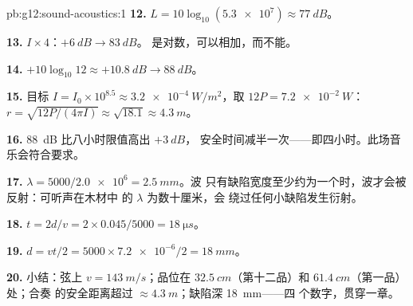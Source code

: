 \begin{solution}{pb:g12:sound-acoustics:1}
\textbf{12.} $L = 10\log_{10}(\num{5.3e7}) \approx \qty{77}{dB}$。

\textbf{13.} $I \times 4$：$+\qty{6}{dB} \to \qty{83}{dB}$。
是对数，可以相加，而不能。

\textbf{14.} $+10\log_{10}12 \approx +\qty{10.8}{dB} \to
\qty{88}{dB}$。

\textbf{15.} 目标 $I = I_0 \times 10^{8.5} \approx
\qty{3.2e-4}{W/m^2}$，取 $12P = \qty{7.2e-2}{W}$：
$r = \sqrt{12P/(4\pi I)} \approx \sqrt{18.1} \approx \qty{4.3}{m}$。

\textbf{16.} \qty{88}{dB} 比八小时限值高出 $+\qty{3}{dB}$，
安全时间减半一次——即四小时。此场音乐会符合要求。

\textbf{17.} $\lambda = 5000/\num{2.0e6} = \qty{2.5}{mm}$。波
只有缺陷宽度至少约为一个时，波才会被反射：可听声在木材中
的 $\lambda$ 为数十厘米，会
绕过任何小缺陷发生衍射。

\textbf{18.} $t = 2d/v = 2 \times 0.045/5000 = \qty{18}{\micro s}$。

\textbf{19.} $d = vt/2 = 5000 \times \num{7.2e-6}/2 = \qty{18}{mm}$。

\textbf{20.} 小结：弦上 $v = \qty{143}{m/s}$；品位在
$\qty{32.5}{cm}$（第十二品）和 $\qty{61.4}{cm}$（第一品）处；合奏
的安全距离超过 $\approx \qty{4.3}{m}$；缺陷深 \qty{18}{mm}——四
个数字，贯穿一章。
\end{solution}
